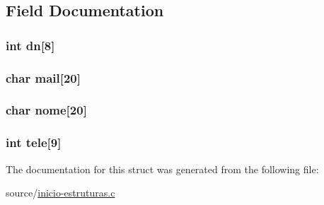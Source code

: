 \subsection{Field Documentation}
\hypertarget{struct_u_t_i_l_i_z_a_d_o_r_e_s_a028f83b677cad53aa15461fe81de4962}{
\subsubsection[{dn}]{\setlength{\rightskip}{0pt plus 5cm}int dn\mbox{[}8\mbox{]}}}\label{struct_u_t_i_l_i_z_a_d_o_r_e_s_a028f83b677cad53aa15461fe81de4962}
\hypertarget{struct_u_t_i_l_i_z_a_d_o_r_e_s_acc4eee01753a98abe33ff84932394203}{
\subsubsection[{mail}]{\setlength{\rightskip}{0pt plus 5cm}char mail\mbox{[}20\mbox{]}}}\label{struct_u_t_i_l_i_z_a_d_o_r_e_s_acc4eee01753a98abe33ff84932394203}
\hypertarget{struct_u_t_i_l_i_z_a_d_o_r_e_s_a9ccb3b1009c0baf8e49e38488c83732a}{
\subsubsection[{nome}]{\setlength{\rightskip}{0pt plus 5cm}char nome\mbox{[}20\mbox{]}}}\label{struct_u_t_i_l_i_z_a_d_o_r_e_s_a9ccb3b1009c0baf8e49e38488c83732a}
\hypertarget{struct_u_t_i_l_i_z_a_d_o_r_e_s_a423ca1da39ebd30724400f2fb097c2ea}{
\subsubsection[{tele}]{\setlength{\rightskip}{0pt plus 5cm}int tele\mbox{[}9\mbox{]}}}\label{struct_u_t_i_l_i_z_a_d_o_r_e_s_a423ca1da39ebd30724400f2fb097c2ea}


The documentation for this struct was generated from the following file\+:\begin{DoxyCompactItemize}
\item 
source/\hyperlink{inicio-estruturas_8c}{inicio-\/estruturas.\+c}\end{DoxyCompactItemize}
